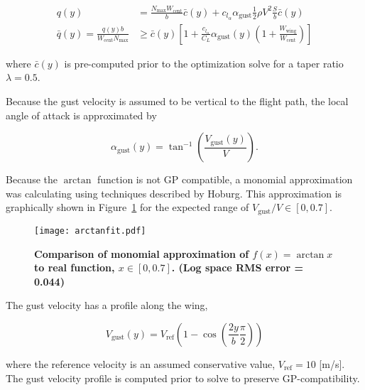 \documentclass[]{aiaa-tc}%
\begin{document}
\begin{align}
    q(y) &= \frac{N_{\text{max}}W_{\text{cent}}}{b}\bar{c}(y) + c_{l_{\alpha}} \alpha_{\text{gust}} \frac{1}{2} \rho V^2 \frac{S}{b}\bar{c}(y) \\
    \bar{q}(y) = \frac{q(y)b}{W_{\text{cent}}N_{\text{max}}} &\geq \bar{c}(y) \left[1 + \frac{c_{l_{\alpha}}}{C_L} \alpha_{\text{gust}} (y) \left(1 + \frac{W_{\text{wing}}}{W_{\text{cent}}} \right) \right]
\end{align}

where $\bar{c}(y)$ is pre-computed prior to the optimization solve for a taper ratio $\lambda = 0.5$.

Because the gust velocity is assumed to be vertical to the flight path, the local angle of attack is approximated by 

\begin{equation}
    \label{e:gustalpha}
    \alpha_{\text{gust}}(y)  = \tan^{-1}\left(\frac{V_{\text{gust}}(y)}{V} \right).
\end{equation}

Because the $\arctan$ function is not GP compatible, a monomial approximation was calculating using techniques described by Hoburg\cite{fitting}.
This approximation is graphically shown in Figure~\ref{f:arctanfit} for the expected range of $V_{\text{gust}}/V \in [0, 0.7]$.  

\begin{figure}[H]
	\begin{center}
	\texttt{[image: arctanfit.pdf]}
    \caption{ \textbf{ Comparison of monomial approximation of $f(x) = \arctan{x}$ to real function, $x \in [0,0.7]$. (Log space RMS error = 0.044) }}
	\label{f:arctanfit}
	\end{center}
\end{figure}

The gust velocity has a profile along the wing\cite{acgust},

\begin{equation}
    \label{e:gustwind}
    V_{\text{gust}}(y) = V_{\text{ref}} \left(1-\cos\left(\frac{2y}{b} \frac{\pi}{2} \right) \right)
\end{equation}

where the reference velocity is an assumed conservative value\cite{acgust}, $V_{\text{ref}} = 10$ [m/s]. The gust velocity profile is computed prior to solve to preserve GP-compatibility.

\end{document}
